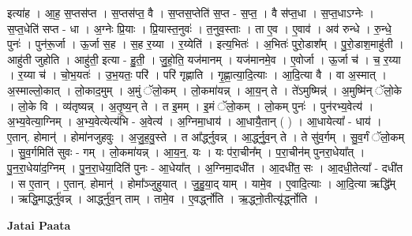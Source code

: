 \documentclass[17pt]{extarticle}
\begin{document}
इत्या॑ह । आ॒ह॒ स॒प्तस॑प्त । स॒प्तस॑प्त॒ वै । स॒प्तस॒प्तेति॑ स॒प्त - स॒प्त॒ । वै स॑प्त॒धा । स॒प्त॒धाऽग्नेः । स॒प्त॒धेति॑ सप्त - धा । अ॒ग्नेः प्रि॒याः । प्रि॒यास्त॒नुवः॑ । त॒नुव॒स्ताः । ता ए॒व । ए॒वाव॑ । अव॑ रुन्धे । रु॒न्धे॒ पुनः॑ । पुन॑रू॒र्जा । ऊ॒र्जा स॒ह । स॒ह र॒य्या । र॒य्येति॑ । इत्य॒भितः॑ । अ॒भितः॑ पुरो॒डाश᳚म् । पु॒रो॒डाश॒माहु॑ती । आहु॑ती जुहोति । आहु॑ती॒ इत्या - हु॒ती॒ । जु॒हो॒ति॒ यज॑मानम् । यज॑मानमे॒व । ए॒वोर्जा । ऊ॒र्जा च॑ । च॒ र॒य्या । र॒य्या च॑ । चो॒भ॒यतः॑ । उ॒भ॒यतः॒ परि॑ । परि॑ गृह्णाति । गृ॒ह्णा॒त्या॒दि॒त्याः । आ॒दि॒त्या वै । वा अ॒स्मात् । अ॒स्माल्लो॒कात् । लो॒काद॒मुम् । अ॒मुं ॅलो॒कम् । लो॒कमा॑यन्न् । आ॒य॒न् ते । ते॑ऽमुष्मिन्न्॑ । अ॒मुष्मि॑न् ॅलो॒के । लो॒के वि । व्य॑तृष्यन्न् । अ॒तृ॒ष्य॒न् ते । त इ॒मम् । इ॒मं ॅलो॒कम् । लो॒कम् पुनः॑ । पुन॑रभ्य॒वेत्य॑ । अ॒भ्य॒वेत्या॒ग्निम् । अ॒भ्य॒वेत्येत्य॑भि - अ॒वेत्य॑ । अ॒ग्निमा॒धाय॑ । आ॒धायै॒तान् ( ) । आ॒धायेत्या᳚ - धाय॑ । ए॒तान्. होमान्॑ । होमा॑नजुहवुः । अ॒जु॒ह॒वु॒स्ते । त आ᳚र्द्ध्नुवन्न् । आ॒र्द्ध्नु॒व॒न् ते । ते सु॑व॒र्गम् । सु॒व॒र्गं ॅलो॒कम् । सु॒व॒र्गमिति॑ सुवः - गम् । लो॒कमा॑यन्न् । आ॒य॒न्॒. यः । यः प॑रा॒चीन᳚म् । प॒रा॒चीन॑म् पुनरा॒धेया᳚त् । पु॒न॒रा॒धेया॑द॒ग्निम् । पु॒न॒रा॒धेया॒दिति॑ पुनः - आ॒धेया᳚त् । अ॒ग्निमा॒दधी॑त । आ॒दधी॑त॒ सः । आ॒दधी॒तेत्या᳚ - दधी॑त । स ए॒तान् । ए॒तान्. होमान्॑ । होमा᳚ञ्जुहुयात् । जु॒हु॒या॒द् याम् । यामे॒व । ए॒वादि॒त्याः । आ॒दि॒त्या ऋद्धि᳚म् । ऋद्धि॒मार्द्ध्नु॑वन्न् । आर्द्ध्नु॑व॒न् ताम् । तामे॒व । ए॒वर्द्ध्नो॑ति । ऋ॒द्ध्नो॒तीत्यृ॑र्द्ध्नोति । \newline

\textbf{Jatai Paata} \newline
\end{document}
